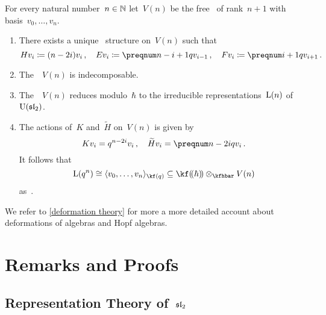 \documentclass[a4paper, 11pt, oneside]{scrartcl}
\begin{document}
\begin{theorem}
  For every natural number~$n \in \mathbb{N}$ let~$V(n)$ be the free~\module{$\kfhbar$} of rank~$n+1$ with basis~$v_0, \dotsc, v_n$.
  \begin{enumerate}
    \item
      There exists a unique~ structure on~$V(n)$ such that
      \[
        H v_i \defined (n - 2i) v_i \,,
        \quad
        E v_i \defined \qnum{n - i + 1} v_{i-1} \,,
        \quad
        F v_i \defined \qnum{i+1} v_{i+1} \,.
      \]
    \item
      The~~$V(n)$ is indecomposable.
    \item
      The~~$V(n)$ reduces modulo~$\hbar$ to the irreducible representations~$\operatorname{L}(n)$ of~$\operatorname{U}(\mathfrak{sl}_2)$.
    \item
      The actions of~$K$ and~$\widetilde{H}$ on~$V(n)$ is given by
      \[
        K v_i
        =
        q^{n - 2i} v_i \,,
        \quad
        \widetilde{H} v_i
        =
        \qnum{n - 2i} v_i \,.
      \]
      It follows that
      \[
        \irred(q^n)
        \cong
        \gen{v_0, \dotsc, v_n}_{\kf(q)}
        \subseteq
        \lpower{\kf}{\hbar} \tensor_{\kfhbar} V(n)
      \]
      as~.
  \end{enumerate}
\end{theorem}

We refer to \cref{deformation theory} for more a more detailed account about deformations of algebras and Hopf algebras.





\newpage
\appendix





\section{Remarks and Proofs}



\subsection{Representation Theory of~$\mathfrak{sl}_2$}
\label{appendix representation theory of sl2}

\end{document}
